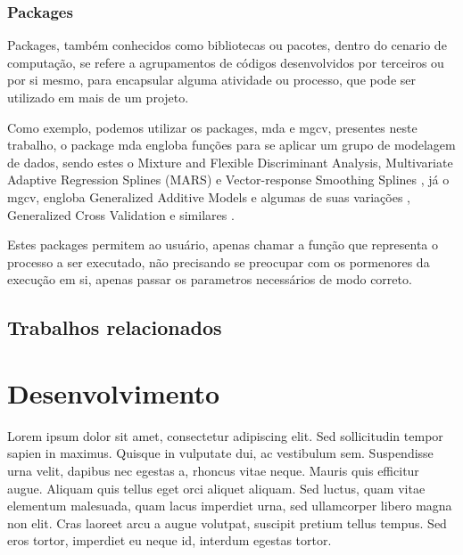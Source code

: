 \documentclass[
	12pt,				%
	openright,			%
	oneside,			%
	a4paper,			%
	english,			%
	brazil				%
	]{abntex2}
\begin{document}
\subsection{Packages}

Packages, também conhecidos como bibliotecas ou pacotes, dentro do cenario de computação, se refere a agrupamentos de códigos
desenvolvidos por terceiros ou por si mesmo, para encapsular alguma atividade ou processo, que pode ser utilizado em mais
de um projeto.

Como exemplo, podemos utilizar os packages, mda e mgcv, presentes neste trabalho, o package mda engloba funções para se aplicar
um grupo de modelagem de dados, sendo estes o Mixture and Flexible Discriminant Analysis, Multivariate Adaptive Regression 
Splines (MARS) e Vector-response Smoothing Splines \cite{mda}, já o mgcv, engloba Generalized Additive Models e algumas de suas variações
, Generalized Cross Validation e similares \cite{mgcv}.

Estes packages permitem ao usuário, apenas chamar a função que representa o processo a ser executado, não precisando se preocupar com
os pormenores da execução em si, apenas passar os parametros necessários de modo correto.

\section{Trabalhos relacionados}



 \chapter{Desenvolvimento}

 Lorem ipsum dolor sit amet, consectetur adipiscing elit. Sed sollicitudin tempor sapien in maximus. Quisque in vulputate dui, ac vestibulum sem. Suspendisse urna velit, dapibus nec egestas a, rhoncus vitae neque. Mauris quis efficitur augue. Aliquam quis tellus eget orci aliquet aliquam. Sed luctus, quam vitae elementum malesuada, quam lacus imperdiet urna, sed ullamcorper libero magna non elit. Cras laoreet arcu a augue volutpat, suscipit pretium tellus tempus. Sed eros tortor, imperdiet eu neque id, interdum egestas tortor.

\end{document}
